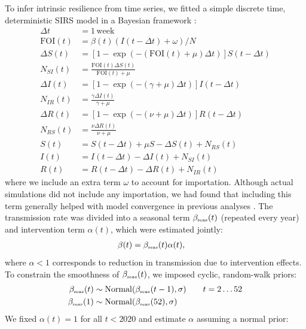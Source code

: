 \documentclass[12pt]{article}
\newcommand{\comment}{\showcomment}
\newcommand{\showcomment}[3]{\textcolor{#1}{\textbf{[#2: }\textsl{#3}\textbf{]}}}
\newcommand{\swp}[1]{\comment{magenta}{SWP}{#1}}
\newcommand{\tsub}[2]{#1_{{\textrm{\tiny #2}}}}
\begin{document}
To infer intrinsic resilience from time series, we fitted a simple discrete time, deterministic SIRS model in a Bayesian framework \citep{park2024predicting}:
\begin{align}
\Delta t &= 1\,\mathrm{week}\\
\textrm{FOI}(t) &= \beta(t) (I(t- \Delta t)+\omega)/N\\
\Delta S(t) &= \left[1- \exp(-(\textrm{FOI}(t) + \mu) \Delta t )\right] S(t-\Delta t)\\
N_{SI}(t) &= \frac{\textrm{FOI}(t)\Delta S(t)}{\textrm{FOI}(t) + \mu} \\
\Delta I(t) &= \left[1- \exp(-(\gamma + \mu) \Delta t )\right] I(t-\Delta t)\\
N_{IR}(t) &= \frac{\gamma \Delta I(t)}{\gamma + \mu} \\
\Delta R(t) &= \left[1- \exp(-(\nu + \mu) \Delta t )\right] R(t-\Delta t)\\
N_{RS}(t) &= \frac{\nu \Delta R(t)}{\nu + \mu} \\
S(t) &= S(t-\Delta t) + \mu S - \Delta S(t) + N_{RS}(t)  \\
I(t) &= I(t-\Delta t) - \Delta I(t) + N_{SI}(t)  \\
R(t) &= R(t-\Delta t) - \Delta R(t) + N_{IR}(t)
\end{align}
where we include an extra term $\omega$ to account for importation.
Although actual simulations did not include any importation, we had found that including this term generally helped with model convergence in previous analyses \citep{park2024predicting}.
The transmission rate was divided into a seasonal term $\tsub{\beta}{seas}(t)$ (repeated every year) and intervention term $\alpha(t)$, which were estimated jointly:
\begin{align}
\beta(t) &= \tsub{\beta}{seas}(t) \alpha(t),
\end{align}
where $\alpha < 1$ corresponds to reduction in transmission due to intervention effects.
To constrain the smoothness of $\tsub{\beta}{seas}(t)$, we imposed cyclic, random-walk priors:
\begin{align}
\tsub{\beta}{seas}(t) &\sim \mathrm{Normal}(\tsub{\beta}{seas}(t-1), \sigma) \qquad t = 2 \dots 52\\
\tsub{\beta}{seas}(1) &\sim \mathrm{Normal}(\tsub{\beta}{seas}(52), \sigma)
\end{align}
We fixed $\alpha(t)=1$ for all $t < 2020$ and estimate $\alpha$ assuming a normal prior:
\end{document}
